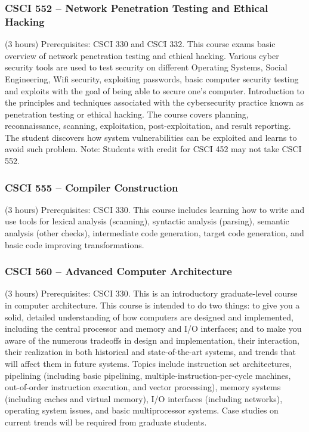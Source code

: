 \subsubsection{CSCI 552 -- Network Penetration Testing and Ethical Hacking}%
\label{course:CSCI:552}
(3 hours) Prerequisites: CSCI 330 and CSCI 332. This course exams basic overview of network penetration testing and ethical hacking. Various cyber security tools are used to test security on different Operating Systems, Social Engineering, Wifi security, exploiting passwords, basic computer security testing and exploits with the goal of being able to secure one’s computer. Introduction to the principles and techniques associated with the cybersecurity practice known as penetration testing or ethical hacking. The course covers planning, reconnaissance, scanning, exploitation, post-exploitation, and result reporting. The student discovers how system vulnerabilities can be exploited and learns to avoid such problem. Note: Students with credit for CSCI 452 may not take CSCI 552.

\subsubsection{CSCI 555 -- Compiler Construction}%
\label{course:CSCI:555}
(3 hours) Prerequisites: CSCI 330. This course includes learning how to write and use tools for lexical analysis (scanning), syntactic analysis (parsing), semantic analysis (other checks), intermediate code generation, target code generation, and basic code improving transformations.


\subsubsection{CSCI 560 -- Advanced Computer Architecture}%
\label{course:CSCI:560}
(3 hours) Prerequisites: CSCI 330. This is an introductory graduate-level course in computer architecture. This course is intended to do two things: to give you a solid, detailed understanding of how computers are designed and implemented, including the central processor and memory and I/O interfaces; and to make you aware of the numerous tradeoffs in design and implementation, their interaction, their realization in both historical and state-of-the-art systems, and trends that will affect them in future systems. Topics include instruction set architectures, pipelining (including basic pipelining, multiple-instruction-per-cycle machines, out-of-order instruction execution, and vector processing), memory systems (including caches and virtual memory), I/O interfaces (including networks), operating system issues, and basic multiprocessor systems.  Case studies on current trends will be required from graduate students. 

